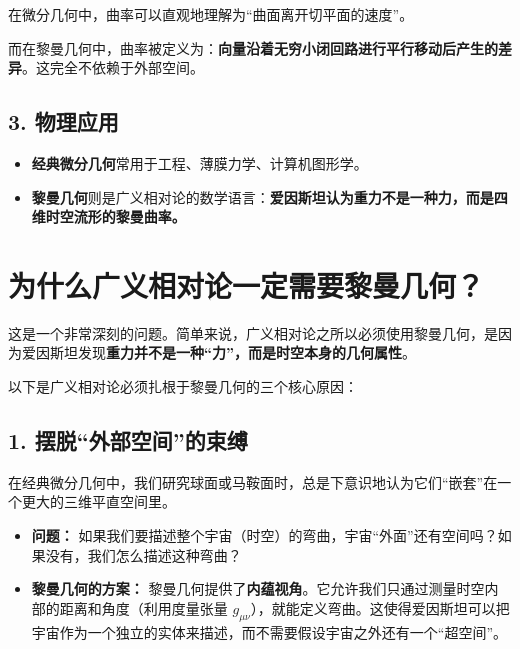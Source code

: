 在微分几何中，曲率可以直观地理解为“曲面离开切平面的速度”。

而在黎曼几何中，曲率被定义为：\textbf{向量沿着无穷小闭回路进行平行移动后产生的差异}。这完全不依赖于外部空间。

\subsection*{3. 物理应用}

\begin{itemize}
\item \textbf{经典微分几何}常用于工程、薄膜力学、计算机图形学。
\item \textbf{黎曼几何}则是广义相对论的数学语言：{\bf 爱因斯坦认为重力不是一种力，而是四维时空流形的黎曼曲率。}
\end{itemize}

%
%

\section{为什么广义相对论一定需要黎曼几何？}
这是一个非常深刻的问题。简单来说，广义相对论之所以必须使用黎曼几何，是因为爱因斯坦发现\textbf{重力并不是一种“力”，而是时空本身的几何属性}。

以下是广义相对论必须扎根于黎曼几何的三个核心原因：
\subsection*{1. 摆脱“外部空间”的束缚}
在经典微分几何中，我们研究球面或马鞍面时，总是下意识地认为它们“嵌套”在一个更大的三维平直空间里。
\begin{itemize}
\item \textbf{问题：} 如果我们要描述整个宇宙（时空）的弯曲，宇宙“外面”还有空间吗？如果没有，我们怎么描述这种弯曲？
\item \textbf{黎曼几何的方案：} 黎曼几何提供了\textbf{内蕴视角}。它允许我们只通过测量时空内部的距离和角度（利用度量张量 $g_{\mu\nu}$），就能定义弯曲。这使得爱因斯坦可以把宇宙作为一个独立的实体来描述，而不需要假设宇宙之外还有一个“超空间”。
\end{itemize}
